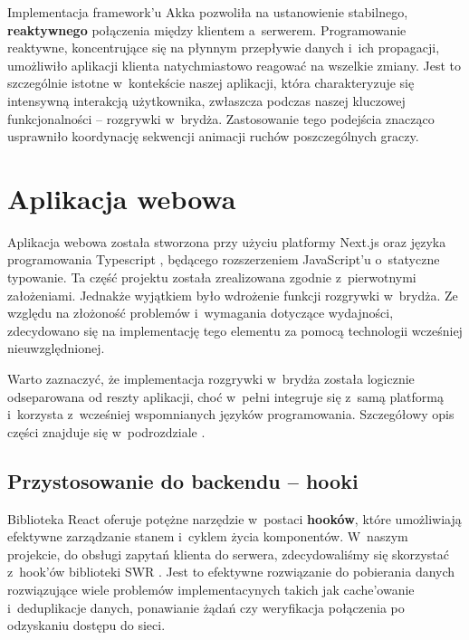 Implementacja framework'u Akka \cite{Akka} pozwoliła na ustanowienie stabilnego,
\textbf{reaktywnego} połączenia między klientem a~serwerem. Programowanie
reaktywne, koncentrujące się na płynnym przepływie danych i~ich propagacji,
umożliwiło aplikacji klienta natychmiastowo reagować na wszelkie zmiany. Jest
to szczególnie istotne w~kontekście naszej aplikacji, która charakteryzuje
się intensywną interakcją użytkownika, zwłaszcza podczas naszej kluczowej
funkcjonalności -- rozgrywki w~brydża. Zastosowanie tego podejścia
znacząco usprawniło koordynację sekwencji animacji ruchów poszczególnych
graczy.


\section{Aplikacja webowa}
Aplikacja webowa została stworzona przy użyciu platformy Next.js
\cite{NextJS} oraz języka programowania Typescript \cite{Typescript},
będącego rozszerzeniem JavaScript'u
o~statyczne typowanie. Ta część projektu została zrealizowana zgodnie
z~pierwotnymi założeniami. Jednakże wyjątkiem było wdrożenie funkcji
rozgrywki w~brydża. Ze względu na złożoność problemów i~wymagania
dotyczące wydajności, zdecydowano się na implementację tego elementu za
pomocą technologii wcześniej nieuwzględnionej.

Warto zaznaczyć, że implementacja rozgrywki w~brydża została logicznie
odseparowana od reszty aplikacji, choć w~pełni integruje się z~samą
platformą i~korzysta z~wcześniej wspomnianych języków programowania.
Szczegółowy opis części znajduje się w~podrozdziale .

\subsection{Przystosowanie do backendu -- hooki}
Biblioteka React oferuje potężne narzędzie w~postaci \textbf{hooków},
które umożliwiają efektywne zarządzanie stanem i~cyklem życia komponentów.
W~naszym projekcie, do obsługi zapytań klienta do serwera, zdecydowaliśmy się
skorzystać z~hook'ów biblioteki SWR \cite{SWR}.
Jest to efektywne rozwiązanie do
pobierania danych rozwiązujące wiele problemów implementacynych takich jak
cache'owanie i~deduplikacje danych, ponawianie żądań czy weryfikacja połączenia
po odzyskaniu dostępu do sieci.

